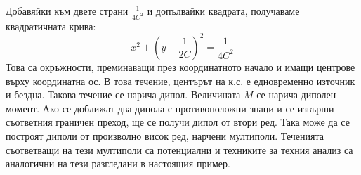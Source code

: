 Добавяйки към двете страни $\frac{1}{4 C^2}$ и допълвайки квадрата, получаваме квадратичната крива:
\begin{equation}
    x^2 + \left(y - \frac{1}{2 C}\right)^2 = \frac{1}{4 C^2}
\end{equation}
Това са окръжности, преминаващи през координатното начало и имащи центрове върху координатна ос. В това течение, центърът на к.с. е едновременно източник и бездна. Такова течение се нарича дипол.
Величината $M$ се нарича диполен момент. Ако се доближат два дипола с противоположни знаци и се извърши съответния граничен преход, ще се получи дипол от втори ред. Така може да се построят диполи от 
произволно висок ред, нарчени мултиполи. Теченията съответващи на тези мултиполи са потенциални и техниките за техния анализ са аналогични на тези разгледани в настоящия пример.